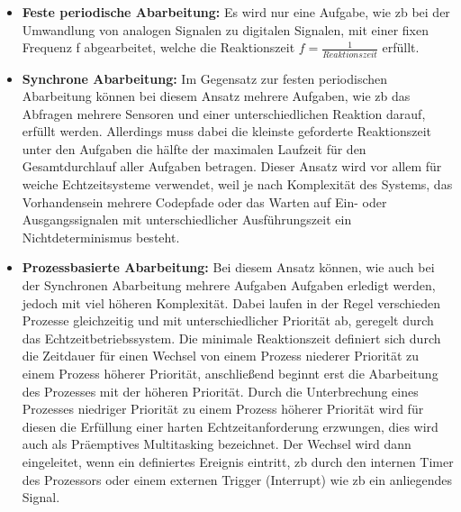 \documentclass[../EDF Master Thesis.tex]{subfiles}
\begin{document}
    \begin{itemize}
        \item \textbf{Feste periodische Abarbeitung:} Es wird nur eine Aufgabe, wie \ac{zb} bei der Umwandlung von analogen Signalen zu digitalen Signalen, mit einer fixen Frequenz f abgearbeitet, welche die Reaktionszeit $ f = \frac{1}{Reaktionszeit}$ erfüllt.
        \item \textbf{Synchrone Abarbeitung:} Im Gegensatz zur festen periodischen Abarbeitung können bei diesem Ansatz mehrere Aufgaben, wie \ac{zb} das Abfragen mehrere Sensoren und einer unterschiedlichen Reaktion darauf, erfüllt werden.
            Allerdings muss dabei die kleinste geforderte Reaktionszeit unter den Aufgaben die hälfte der maximalen Laufzeit für den Gesamtdurchlauf aller Aufgaben betragen.
            Dieser Ansatz wird vor allem für weiche Echtzeitsysteme verwendet, weil je nach Komplexität des Systems, das Vorhandensein mehrere Codepfade oder das Warten auf Ein- oder Ausgangssignalen mit unterschiedlicher Ausführungszeit ein Nichtdeterminismus besteht.
        \item \textbf{Prozessbasierte Abarbeitung:} Bei diesem Ansatz können, wie auch bei der Synchronen Abarbeitung mehrere Aufgaben Aufgaben erledigt werden, jedoch mit viel höheren Komplexität.
            Dabei laufen in der Regel verschieden Prozesse gleichzeitig und mit unterschiedlicher Priorität ab, geregelt durch das Echtzeitbetriebssystem.
            Die minimale Reaktionszeit definiert sich durch die Zeitdauer für einen Wechsel von einem Prozess niederer Priorität zu einem Prozess höherer Priorität, anschließend beginnt erst die Abarbeitung des Prozesses mit der höheren Priorität.
            Durch die Unterbrechung eines Prozesses niedriger Priorität zu einem Prozess höherer Priorität wird für diesen die Erfüllung einer harten Echtzeitanforderung erzwungen, dies wird auch als Präemptives Multitasking bezeichnet.
            Der Wechsel wird dann eingeleitet, wenn ein definiertes Ereignis eintritt, \ac{zb} durch den internen Timer des Prozessors oder einem externen Trigger (Interrupt) wie \ac{zb} ein anliegendes Signal.
    \end{itemize}
\end{document}

